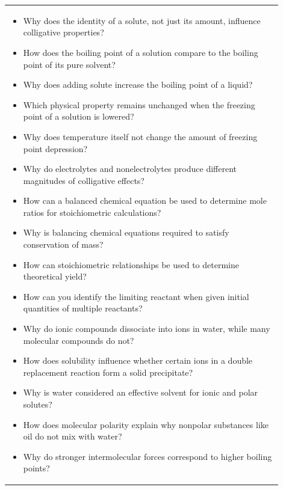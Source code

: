 \documentclass{article}
\begin{document}
\begin{tabular}{|p{0.9\linewidth}|}
\hline
\begin{itemize}
    \item Why does the identity of a solute, not just its amount, influence colligative properties?
    \item How does the boiling point of a solution compare to the boiling point of its pure solvent?
    \item Why does adding solute increase the boiling point of a liquid?
    \item Which physical property remains unchanged when the freezing point of a solution is lowered?
    \item Why does temperature itself not change the amount of freezing point depression?
    \item Why do electrolytes and nonelectrolytes produce different magnitudes of colligative effects?
    \item How can a balanced chemical equation be used to determine mole ratios for stoichiometric calculations?
    \item Why is balancing chemical equations required to satisfy conservation of mass?
    \item How can stoichiometric relationships be used to determine theoretical yield?
    \item How can you identify the limiting reactant when given initial quantities of multiple reactants?
    \item Why do ionic compounds dissociate into ions in water, while many molecular compounds do not?
    \item How does solubility influence whether certain ions in a double replacement reaction form a solid precipitate?
    \item Why is water considered an effective solvent for ionic and polar solutes?
    \item How does molecular polarity explain why nonpolar substances like oil do not mix with water?
    \item Why do stronger intermolecular forces correspond to higher boiling points?
\end{itemize}\\[0.2cm]
\end{tabular}
\newpage
\end{document}
